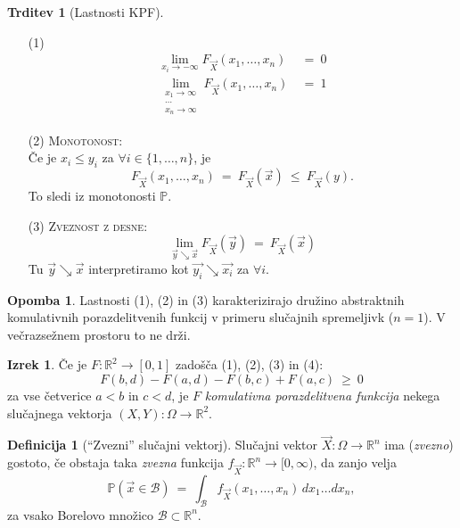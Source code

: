 \documentclass[11pt]{article}
\newcommand{\1}{\mathbbm{1}}
\theoremstyle{definition}
\newtheorem{definicija}{Definicija}[section]
\theoremstyle{definition}
\newtheorem{trditev}{Trditev}[section]
\theoremstyle{definition}
\newtheorem{izrek}{Izrek}[section]
\newtheorem*{opomba}{Opomba}
\begin{document}
\begin{trditev}[Lastnosti KPF]
~
\begin{enumerate}

	\item[(1)] \begin{align*}
		\lim_{x_i \rightarrow -\infty} F_{\vec{X}}(x_1, \ldots, x_n) ~&=~ 0 \\
		\lim_{\substack{x_1 \rightarrow \infty \\ \cdots \\ x_n \rightarrow \infty}} F_{\vec{X}}(x_1, \ldots, x_n) ~&=~ 1 
		\end{align*}
	
	\item[(2)] \textsc{Monotonost}: \\Če je $x_i \leq y_i$ za $\forall i \in \{ 1,\ldots, n \}$, je
	$$F_{\vec{X}}(x_1, \ldots, x_n) ~=~ F_{\vec{X}}(\vec{x}) ~\leq~ F_{\vec{X}}(y).$$
	To sledi iz monotonosti $\mathbb{P}$.
	
	\item[(3)] \textsc{Zveznost z desne}:
	$$\lim_{\vec{y} \searrow \vec{x}} F_{\vec{X}}(\vec{y}) ~=~ F_{\vec{X}}(\vec{x})$$
	Tu $\vec{y} \searrow \vec{x}$ interpretiramo kot $\vec{y_i} \searrow \vec{x_i}$ za $\forall i$.
	
\end{enumerate}
\end{trditev}
\vspace{0.5cm}

\begin{opomba}

Lastnosti (1), (2) in (3) karakterizirajo družino abstraktnih komulativnih porazdelitvenih funkcij v primeru slučajnih spremeljivk ($n=1$). V večrazsežnem prostoru to ne drži.

\end{opomba}
\vspace{0.5cm}

\begin{izrek}

Če je $F: \mathbb{R}^2 \rightarrow [0, 1]$ zadošča (1), (2), (3) in (4): 
$$F(b, d) - F(a, d) - F(b, c) + F(a, c) ~\geq~ 0$$
za vse četverice $a < b$ in $c < d$, je $F$ \textit{komulativna porazdelitvena funkcija} nekega slučajnega vektorja $(X, Y): \Omega \rightarrow \mathbb{R}^2$.

\end{izrek}
\vspace{0.5cm}

\begin{definicija}[``Zvezni'' slučajni vektorj]

Slučajni vektor $\vec{X}: \Omega \rightarrow \mathbb{R}^n$ ima (\textit{zvezno}) gostoto, če obstaja taka \textit{zvezna} funkcija $f_{\vec{X}}: \mathbb{R}^n \rightarrow [0, \infty)$, da zanjo velja
$$\mathbb{P}(\vec{x} \in \mathcal{B}) ~=~ \int_{\mathcal{B}} f_{\vec{X}}(x_1, \ldots, x_n)\,dx_1 \ldots dx_n,$$ 
za vsako Borelovo množico $\mathcal{B} \subset \mathbb{R}^n$.

\end{definicija}
\vspace{0.5cm}
\end{document}
